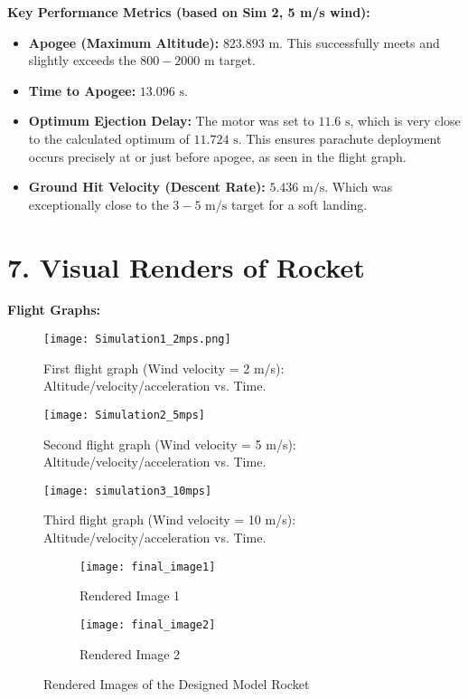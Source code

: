 \documentclass[12pt, a4paper]{article}
\begin{document}
\textbf{Key Performance Metrics (based on Sim 2, 5 m/s wind):}
\begin{itemize}
    \item \textbf{Apogee (Maximum Altitude):} $823.893 \text{ m}$. This successfully meets and slightly exceeds the $800-2000 \text{ m}$ target.
    \item \textbf{Time to Apogee:} $13.096 \text{ s}$.
    \item \textbf{Optimum Ejection Delay:} The motor was set to $11.6 \text{ s}$, which is very close to the calculated optimum of $11.724 \text{ s}$. This ensures parachute deployment occurs precisely at or just before apogee, as seen in the flight graph.
    \item \textbf{Ground Hit Velocity (Descent Rate):} $5.436 \text{ m/s}$. Which was exceptionally close to the $3-5 \text{ m/s}$ target for a soft landing.
\end{itemize}

\section*{7. Visual Renders of Rocket}
\textbf{Flight Graphs:}
\begin{figure}[H]
    \centering
    \texttt{[image: Simulation1\_2mps.png]} 
    \caption{First flight graph (Wind velocity = 2 m/s): Altitude/velocity/acceleration vs. Time.}
    \label{fig:flight_graph_1}
\end{figure}

\begin{figure}[H]
    \centering
    \texttt{[image: Simulation2\_5mps]}
    \caption{Second flight graph (Wind velocity = 5 m/s): Altitude/velocity/acceleration vs. Time.}
    \label{fig:flight_graph_2}
\end{figure}

\begin{figure}[H]
    \centering
    \texttt{[image: simulation3\_10mps]}
    \caption{Third flight graph (Wind velocity = 10 m/s): Altitude/velocity/acceleration vs. Time.}
    \label{fig:flight_graph_3}
\end{figure}

\begin{figure}[H]
    \centering
    \begin{subfigure}[b]{0.48\textwidth}
        \centering
        \texttt{[image: final\_image1]}
        \caption{Rendered Image 1}
        \label{fig:render1}
    \end{subfigure}
    \hfill %
    \begin{subfigure}[b]{0.48\textwidth}
        \centering
        \texttt{[image: final\_image2]}
        \caption{Rendered Image 2}
        \label{fig:render2}
    \end{subfigure}
    \caption{Rendered Images of the Designed Model Rocket}
    \label{fig:renders3}
\end{figure}
\end{document}
